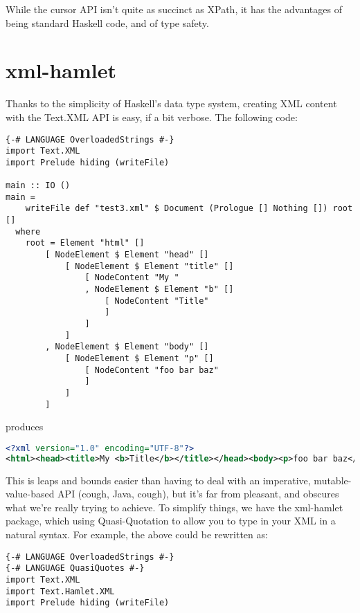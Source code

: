 \begin{itemize}
\begin{end}

While the cursor API isn't quite as succinct as XPath, it has the advantages of being standard Haskell code, and of type safety.

\section{xml-hamlet}

Thanks to the simplicity of Haskell's data type system, creating XML content with the Text.XML API is easy, if a bit verbose. The following code:

\begin{lstlisting}
{-# LANGUAGE OverloadedStrings #-}
import Text.XML
import Prelude hiding (writeFile)

main :: IO ()
main =
    writeFile def "test3.xml" $ Document (Prologue [] Nothing []) root []
  where
    root = Element "html" []
        [ NodeElement $ Element "head" []
            [ NodeElement $ Element "title" []
                [ NodeContent "My "
                , NodeElement $ Element "b" []
                    [ NodeContent "Title"
                    ]
                ]
            ]
        , NodeElement $ Element "body" []
            [ NodeElement $ Element "p" []
                [ NodeContent "foo bar baz"
                ]
            ]
        ]
\end{lstlisting}

produces

\begin{lstlisting}[language=XML]
<?xml version="1.0" encoding="UTF-8"?>
<html><head><title>My <b>Title</b></title></head><body><p>foo bar baz</p></body></html>
\end{lstlisting}

This is leaps and bounds easier than having to deal with an imperative, mutable-value-based API (cough, Java, cough), but it's far from pleasant, and obscures what we're really trying to achieve. To simplify things, we have the xml-hamlet package, which using Quasi-Quotation to allow you to type in your XML in a natural syntax. For example, the above could be rewritten as:

\begin{lstlisting}
{-# LANGUAGE OverloadedStrings #-}
{-# LANGUAGE QuasiQuotes #-}
import Text.XML
import Text.Hamlet.XML
import Prelude hiding (writeFile)


\end{lstlisting}
\end{end}
\end{itemize}
